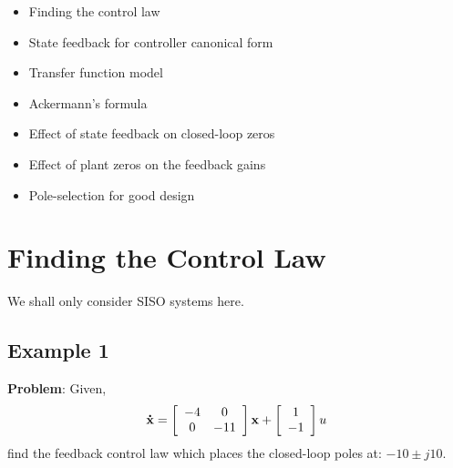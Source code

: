 \ifslidesonly
\begin{slide}
   \begin{itemize}
   	\item Finding the control law
   	\item State feedback for controller canonical form
   	\item Transfer function model
   	\item Ackermann's formula
   	\item Effect of state feedback on closed-loop zeros
   	\item Effect of plant zeros on the feedback gains
   	\item Pole-selection for good design
   \end{itemize}
\end{slide}
\fi
\section*{Finding the Control Law} %
\label{sec:finding_the_control_law}

We shall only consider SISO systems here.


\ifslidesonly
\begin{slide}
   
\end{slide}
\fi


\ifslidesonly
\begin{slide}
   
\end{slide}
\fi

 

\ifslidesonly
\begin{slide}
   
\end{slide}
\fi


\ifslidesonly
\begin{slide}
   
\end{slide}
\fi



\subsection*{Example 1} %
\label{sub:example_1}

\textbf{Problem}: Given,
\[
{\bf{\dot x}} = \left[ {\begin{array}{*{20}c}
   { - 4} & 0  \\
   0 & { - 11}  \\
\end{array}} \right]{\bf{x}} + \left[ {\begin{array}{*{20}c}
   1  \\
   { - 1}  \\
\end{array}} \right]u
\]
find the feedback control law which places the closed-loop poles at: $-10\pm j10$.


